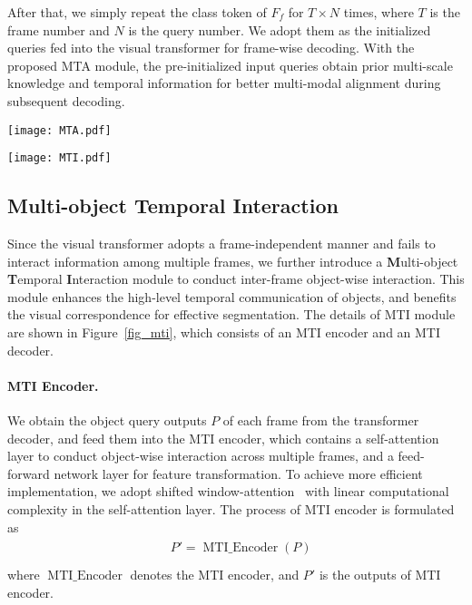 \documentclass{article}
\begin{document}
After that, we simply repeat the class token of $F_f$ for $T\times N$ times, where $T$ is the frame number and $N$ is the query number. We adopt them as the initialized queries fed into the visual transformer for frame-wise decoding. With the proposed MTA module, the pre-initialized input queries obtain prior multi-scale knowledge and temporal information for better multi-modal alignment during subsequent decoding.


\begin{figure*}[t!]
\begin{minipage}[t]{0.54\textwidth}
\texttt{[image: MTA.pdf]}
\caption{\textbf{Multi-scale Temporal Aggregation.} For low-level multi-modal temporal aggregation, we propose MTA module for inter-frame interaction, which generates tokens with multi-modal knowledge as the input queries for transformer decoding.}
\label{fig_mta}
\end{minipage} 
\begin{minipage}[t]{0.434\textwidth}
\texttt{[image: MTI.pdf]}
\caption{\textbf{Multi-object Temporal Interaction.} We introduce MTI module for inter-frame object-wise interaction, and maintain a set of video-wise query representations for associating objects across frames.}
\label{fig_mti}
\end{minipage}
\end{figure*}

\subsection{Multi-object Temporal Interaction}
\label{mti}
Since the visual transformer adopts a frame-independent manner and fails to interact information among multiple frames, we further introduce a \textbf{M}ulti-object \textbf{T}emporal \textbf{I}nteraction module to conduct inter-frame object-wise interaction. This module enhances the high-level temporal communication of objects, and benefits the visual correspondence for effective segmentation. The details of MTI module are shown in Figure~\ref{fig_mti}, which consists of an MTI encoder and an MTI decoder.

\paragraph{MTI Encoder.}
We obtain the object query outputs $P$ of each frame from the transformer decoder, and feed them into the MTI encoder, which contains a self-attention layer to conduct object-wise interaction across multiple frames, and a feed-forward network layer for feature transformation. To achieve more efficient implementation, we adopt shifted window-attention~\cite{liu2021swin} with linear computational complexity in the self-attention layer. The process of MTI encoder is formulated as
\begin{align}
\label{mti_encoder}
\begin{split}
    & P' = \operatorname{MTI\_Encoder}(P)\\
\end{split}
\end{align}
where $\operatorname{MTI\_Encoder}$ denotes the MTI encoder, and $P'$ is the outputs of MTI encoder.
\end{document}
